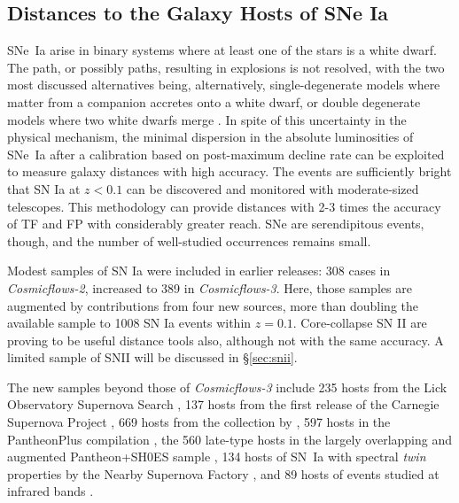\documentclass[twocolumn]{aastex63}
\begin{document}

\subsection{Distances to the Galaxy Hosts of SNe Ia}
\label{sec:sn1a}


SNe~Ia arise in binary systems where at least one of the stars is a white dwarf.  The path, or possibly paths, resulting in explosions is not resolved, with the two most discussed alternatives being, alternatively, single-degenerate models where matter from a companion accretes onto a white dwarf, or double degenerate models where two white dwarfs merge \citep{2014ARA&A..52..107M}.  In spite of this uncertainty in the physical mechanism,
the minimal dispersion in the absolute luminosities of SNe~Ia after a calibration based on post-maximum decline rate \citep{1993ApJ...413L.105P} can be exploited to measure galaxy distances with high accuracy.  The events are sufficiently bright that SN Ia at $z<0.1$ can be discovered and monitored with moderate-sized telescopes.  This methodology can provide distances with 2-3 times the accuracy of TF and FP with considerably greater reach.  SNe are serendipitous events, though, and the number of well-studied occurrences remains small.   

Modest samples of SN Ia were included in earlier releases: 308 cases in {\it Cosmicflows-2}, increased to 389 in {\it Cosmicflows-3}.  Here, those samples are augmented by contributions from four new sources, more than doubling the available sample to 1008 SN Ia events within $z=0.1$.  Core-collapse SN II are proving to be useful distance tools also, although not with the same accuracy. A 
limited sample of SNII will be discussed in \S \ref{sec:snii}.


The new samples beyond those of {\it Cosmicflows-3} include 235 hosts from the Lick Observatory Supernova Search \citep{2013MNRAS.433.2240G}, 137 hosts from the first release of the Carnegie Supernova Project \citep{2018ApJ...869...56B}, 669 hosts from the collection by \citet{2021MNRAS.tmp.1412S}, 597 hosts in the PantheonPlus compilation \citep{2022ApJ...938..110B, 2022ApJ...938..113S}, the 560 late-type hosts in the largely overlapping and augmented Pantheon+SH0ES sample \citep{2022ApJ...934L...7R}, 134 hosts of SN~Ia with spectral {\it twin} properties by the Nearby Supernova Factory \citep{2021ApJ...912...71B}, and 89 hosts of events studied at infrared bands \citep{2019ApJ...887..106A}.  
\end{document}
